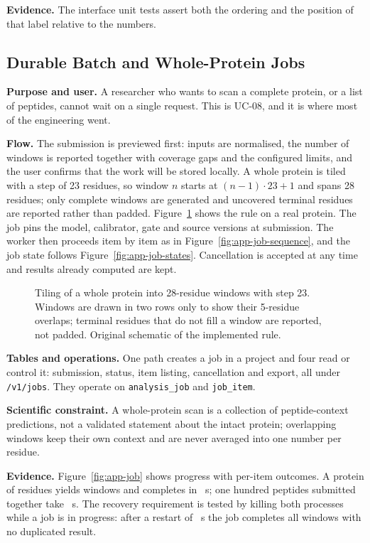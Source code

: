 \textbf{Evidence.} The interface unit tests assert both the ordering and the position of that label
relative to the numbers.

\subsection{Durable Batch and Whole-Protein Jobs}
\textbf{Purpose and user.} A researcher who wants to scan a complete protein, or a list of peptides,
cannot wait on a single request. This is UC-08, and it is where most of the engineering went.

\textbf{Flow.} The submission is previewed first: inputs are normalised, the number of windows is
reported together with coverage gaps and the configured limits, and the user confirms that the work
will be stored locally. A whole protein is tiled with a step of 23 residues, so window $n$ starts at
$(n-1)\cdot 23+1$ and spans 28 residues; only complete windows are generated and uncovered terminal
residues are reported rather than padded. Figure~\ref{fig:app-tiling} shows the rule on a real protein. The job pins the model, calibrator, gate and source
versions at submission. The worker then proceeds item by item as in
Figure~\ref{fig:app-job-sequence}, and the job state follows Figure~\ref{fig:app-job-states}.
Cancellation is accepted at any time and results already computed are kept.

\begin{figure}[htbp]
  \centering
  
  \caption[Tiling of a whole protein into 28-residue windows]{Tiling of a whole protein into 28-residue windows with step 23. Windows are drawn in two
  rows only to show their 5-residue overlaps; terminal residues that do not fill a window are
  reported, not padded. Original schematic of the implemented rule.}
  \label{fig:app-tiling}
\end{figure}

\textbf{Tables and operations.} One path creates a job in a project and four read or control it:
submission, status, item listing, cancellation and export, all under \texttt{/v1/jobs}. They operate
on \texttt{analysis\_job} and \texttt{job\_item}.

\textbf{Scientific constraint.} A whole-protein scan is a collection of peptide-context predictions,
not a validated statement about the intact protein; overlapping windows keep their own context and
are never averaged into one number per residue.

\textbf{Evidence.} Figure~\ref{fig:app-job} shows progress with per-item outcomes. A protein of
\nAppProteinLen{} residues yields \nAppProteinTiles{} windows and completes in
\nAppProteinSeconds{}~s; one hundred peptides submitted together take \nAppPeptidesSeconds{}~s. The recovery requirement is tested by killing both processes while a job is in progress: after
a restart of \nAppRestartSeconds{}~s the job completes all \nAppProteinTiles{} windows with no
duplicated result.


